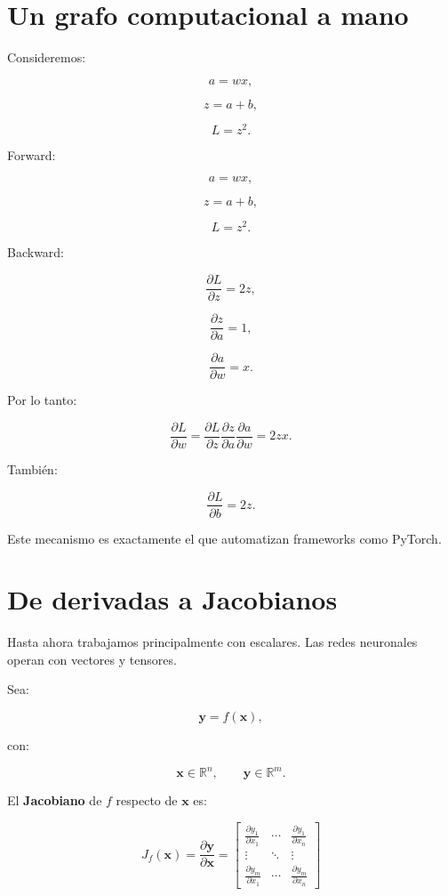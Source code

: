 \documentclass[
  letterpaper,
  DIV=11,
  numbers=noendperiod]{scrartcl}
\begin{document}
\section{Un grafo computacional a
mano}\label{un-grafo-computacional-a-mano}

Consideremos:

\[
a=wx,
\]

\[
z=a+b,
\]

\[
L=z^2.
\]

Forward:

\[
a=wx,
\]

\[
z=a+b,
\]

\[
L=z^2.
\]

Backward:

\[
\frac{\partial L}{\partial z}=2z,
\]

\[
\frac{\partial z}{\partial a}=1,
\]

\[
\frac{\partial a}{\partial w}=x.
\]

Por lo tanto:

\[
\frac{\partial L}{\partial w}
=
\frac{\partial L}{\partial z}
\frac{\partial z}{\partial a}
\frac{\partial a}{\partial w}
=
2zx.
\]

También:

\[
\frac{\partial L}{\partial b}
=
2z.
\]

Este mecanismo es exactamente el que automatizan frameworks como
PyTorch.

\section{De derivadas a Jacobianos}\label{de-derivadas-a-jacobianos}

Hasta ahora trabajamos principalmente con escalares. Las redes
neuronales operan con vectores y tensores.

Sea:

\[
\mathbf y=f(\mathbf x),
\]

con:

\[
\mathbf x\in\mathbb R^n,
\qquad
\mathbf y\in\mathbb R^m.
\]

El \textbf{Jacobiano} de \(f\) respecto de \(\mathbf x\) es:

\[
\boxed{
J_f(\mathbf x)
=
\frac{\partial\mathbf y}{\partial\mathbf x}
=
\begin{bmatrix}
\frac{\partial y_1}{\partial x_1} & \cdots & \frac{\partial y_1}{\partial x_n}\\
\vdots & \ddots & \vdots\\
\frac{\partial y_m}{\partial x_1} & \cdots & \frac{\partial y_m}{\partial x_n}
\end{bmatrix}
}
\]
\end{document}
